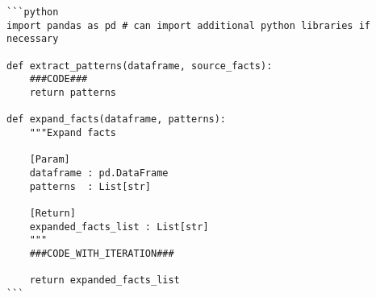 \begin{lstlisting}[label={lst:code}]
```python
import pandas as pd # can import additional python libraries if necessary

def extract_patterns(dataframe, source_facts):
    ###CODE###
    return patterns

def expand_facts(dataframe, patterns):
    """Expand facts

    [Param]
    dataframe : pd.DataFrame
    patterns  : List[str]

    [Return]
    expanded_facts_list : List[str]
    """
    ###CODE_WITH_ITERATION###

    return expanded_facts_list
```
\end{lstlisting}